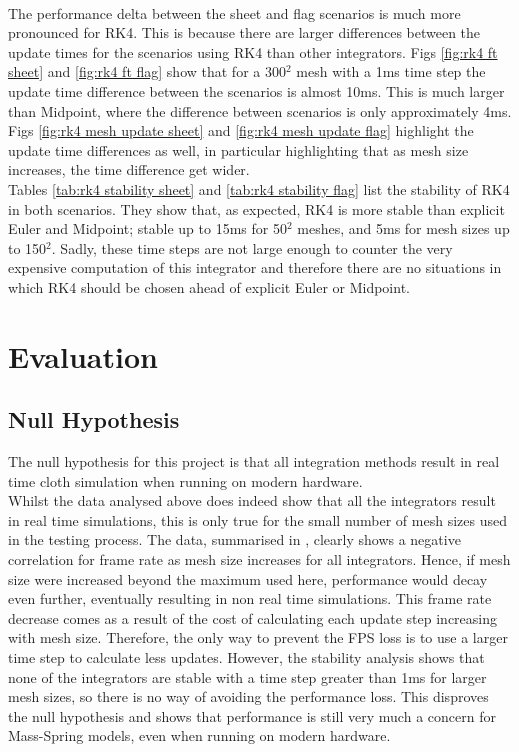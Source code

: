 \\The performance delta between the sheet and flag scenarios is much more pronounced for RK4. This is because there are larger differences between the update times for the scenarios using RK4 than other integrators. Figs \ref{fig:rk4 ft sheet} and \ref{fig:rk4 ft flag} show that for a 300$^{2}$ mesh with a 1ms time step the update time difference between the scenarios is almost 10ms. This is much larger than Midpoint, where the difference between scenarios is only approximately 4ms. Figs \ref{fig:rk4 mesh update sheet} and \ref{fig:rk4 mesh update flag} highlight the update time differences as well, in particular highlighting that as mesh size increases, the time difference get wider.
\\Tables \ref{tab:rk4 stability sheet} and \ref{tab:rk4 stability flag} list the stability of RK4 in both scenarios. They show that, as expected, RK4 is more stable than explicit Euler and Midpoint; stable up to 15ms for 50$^{2}$ meshes, and 5ms for mesh sizes up to 150$^{2}$. Sadly, these time steps are not large enough to counter the very expensive computation of this integrator and therefore there are no situations in which RK4 should be chosen ahead of explicit Euler or Midpoint.

\section{Evaluation}

\subsection{Null Hypothesis}
The null hypothesis for this project is that all integration methods result in real time cloth simulation when running on modern hardware.
\\Whilst the data analysed above does indeed show that all the integrators result in real time simulations, this is only true for the small number of mesh sizes used in the testing process. The data, summarised in , clearly shows a negative correlation for frame rate as mesh size increases for all integrators. Hence, if mesh size were increased beyond the maximum used here, performance would decay even further, eventually resulting in non real time simulations. This frame rate decrease comes as a result of the cost of calculating each update step increasing with mesh size. Therefore, the only way to prevent the FPS loss is to use a larger time step to calculate less updates. However, the stability analysis shows that none of the integrators are stable with a time step greater than 1ms for larger mesh sizes, so there is no way of avoiding the performance loss. This disproves the null hypothesis and shows that performance is still very much a concern for Mass-Spring models, even when running on modern hardware.

